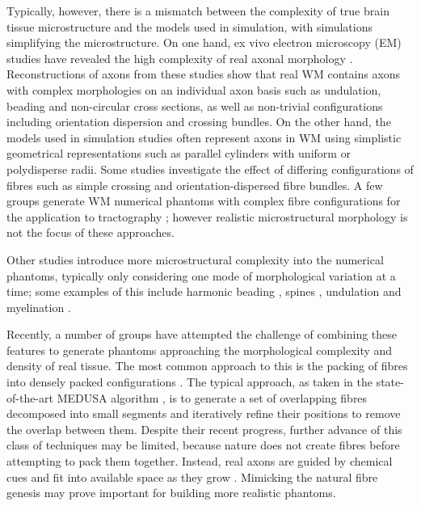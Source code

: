 Typically, however, there is a mismatch between the complexity of true brain tissue microstructure and the models used in simulation, with simulations simplifying the microstructure.
On one hand, ex vivo electron microscopy (EM) studies have revealed the high complexity of real axonal morphology \cite{Abdollahzadeh2019,Lee2019b,Salo2018}.
Reconstructions of axons from these studies show that real WM contains axons with complex morphologies on an individual axon basis such as undulation, beading and non-circular cross sections, as well as non-trivial configurations including orientation dispersion and crossing bundles.
On the other hand, the models used in simulation studies often represent axons in WM using simplistic geometrical representations such as parallel cylinders with uniform \cite{Fieremans2010,Nilsson2010,Nilsson2009,Ford1997} or polydisperse \cite{Alexander2010,Hall2009} radii.
Some studies investigate the effect of differing configurations of fibres such as simple crossing \cite{Rensonnet2017,Zhang2011a} and orientation-dispersed \cite{Tariq2016,Zhang2012,Zhang2011} fibre bundles.
A few groups generate WM numerical phantoms with complex fibre configurations for the application to  tractography \cite{Close2009,Neher2014}; however realistic microstructural morphology is not the focus of these approaches.

Other studies introduce more microstructural complexity into the numerical phantoms, typically only considering one mode of morphological variation at a time; some examples of this include harmonic beading \cite{Budde2010,Landman2010}, spines \cite{Palombo2018}, undulation \cite{Brabec2019,Nilsson2012} and myelination \cite{Brusini2019}.


Recently, a number of groups have attempted the challenge of combining these features to generate phantoms approaching the morphological complexity and density of real tissue.
The most common approach to this is the packing of fibres into densely packed configurations \cite{Close2009,Ginsburger2018,Ginsburger2019,Rafael-Patino2018}.
The typical approach, as taken in the state-of-the-art MEDUSA algorithm \cite{Ginsburger2019}, is to generate a set of overlapping fibres decomposed into small segments and iteratively refine their positions to remove the overlap between them.
Despite their recent progress, further advance of this class of techniques may be limited, because nature does not create fibres before attempting to pack them together.
Instead, real axons are guided by chemical cues and fit into available space as they grow \cite{Price2017,Lowery2009}.
Mimicking the natural fibre genesis may prove important for building more realistic phantoms.

